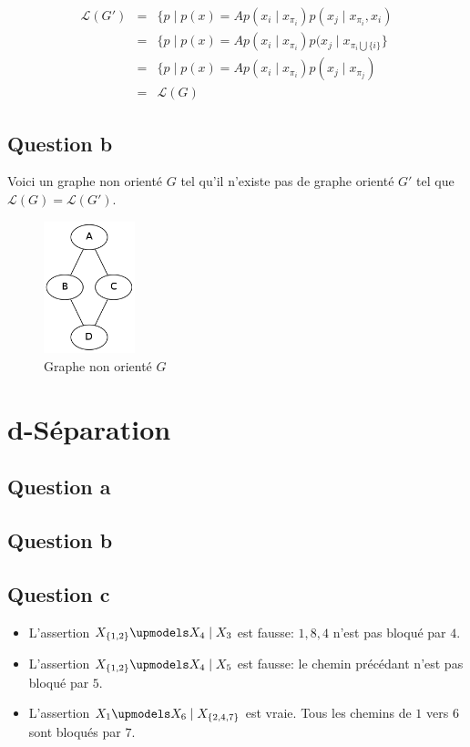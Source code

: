 \documentclass{article}
\begin{document}
\begin{align}
\mathcal{L}(G') & = & \{ p \mid p(x) = A p(x_i \mid x_{\pi_i}) p(x_j \mid x_{\pi_i}, x_i) \\
	        & = & \{ p \mid p(x) = A p(x_i \mid x_{\pi_i}) p(x_j \mid x_{\pi_i \bigcup \{i\}} \} \\
		& = & \{ p \mid p(x) = A p(x_i \mid x_{\pi_i}) p(x_j \mid x_{\pi_j}) \\
		& = & \mathcal{L}(G)
\end{align}


\subsection{Question b}
Voici un graphe non orienté $G$ tel qu'il n'existe pas de graphe orienté $G'$ tel que $\mathcal{L}(G) = \mathcal{L}(G')$.

\begin{figure}[h]
\caption{Graphe non orienté $G$}
\includegraphics[width=100px]{Ia.png}
\end{figure}

\section{d-Séparation}

\subsection{Question a}


\subsection{Question b}

\subsection{Question c}

\begin{itemize}
\item L'assertion $X_{\{1, 2\}} \upmodels X_4 \mid X_3$ est fausse: ${1, 8, 4}$ n'est pas
bloqué par $4$.
\item L'assertion $X_{\{1, 2\}} \upmodels X_4 \mid X_5$ est fausse: le chemin précédant
n'est pas bloqué par $5$.
\item L'assertion $X_1 \upmodels X_6 \mid X_{\{2, 4, 7\}}$ est vraie. Tous les chemins
de $1$ vers $6$ sont bloqués par $7$.
\end{itemize}
\end{document}

